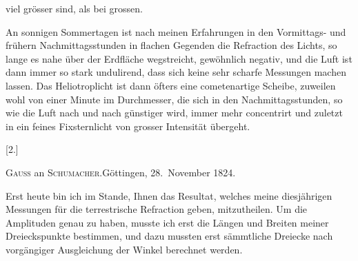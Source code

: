 viel grösser sind, als bei grossen.
\par\noindent\hspace*{\parindent}An sonnigen Sommertagen ist nach meinen Erfahrungen in den Vormittags- und frühern Nachmittagsstunden in flachen Gegenden die Refraction
des Lichts, so lange es nahe über der Erdfläche wegstreicht, gewöhnlich
negativ, und die Luft ist dann immer so stark undulirend, dass sich keine sehr
scharfe Messungen machen lassen. Das Heliotroplicht ist dann öfters eine
cometenartige Scheibe, zuweilen wohl von einer Minute im Durchmesser, die
sich in den Nachmittagsstunden, so wie die Luft nach und nach günstiger
wird, immer mehr concentrirt und zuletzt in ein feines Fixsternlicht von
grosser Intensität übergeht.
\begin{center}
[2.]\par{}\par\bigskip
\textsc{Gauss} an \textsc{Schumacher}.\quad Göttingen, 28.~November 1824.
\end{center}
\par\noindent\hspace*{\parindent}Erst heute bin ich im Stande, Ihnen das Resultat, welches meine diesjährigen Messungen für die terrestrische Refraction geben, mitzutheilen. Um
die Amplituden genau zu haben, musste ich erst die Längen und Breiten
meiner Dreieckspunkte bestimmen, und dazu mussten erst sämmtliche Dreiecke nach vorgängiger Ausgleichung der Winkel berechnet werden.

